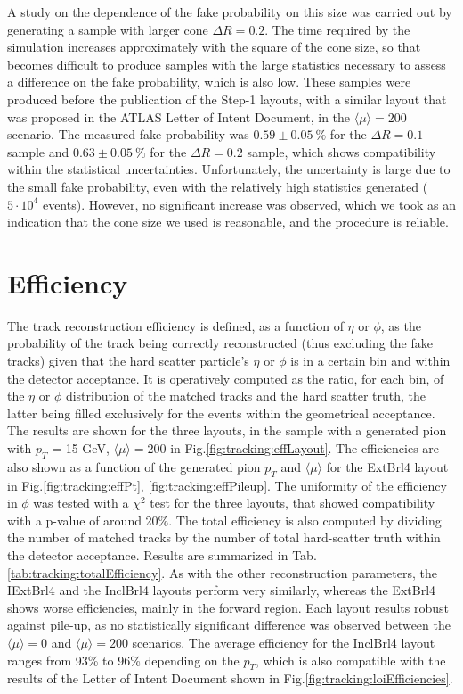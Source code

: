 \documentclass[a4paper,twoside,12pt]{book}
\begin{document}
A study on the dependence of the fake probability on this size was carried out by generating a sample with larger cone $\Delta R = 0.2$.
The time required by the simulation increases approximately with the square of the cone size, so that becomes difficult to produce samples with the large statistics necessary to assess
a difference on the fake probability, which is also low. These samples were produced before the publication of the Step-1 layouts, with a similar layout that was proposed in the
ATLAS Letter of Intent Document\cite{loi}, in the $\langle\mu\rangle = 200$ scenario. The measured fake probability was $0.59 \pm 0.05\ \%$ for the $\Delta R = 0.1$ sample and $0.63 \pm 0.05\ \%$ for
the $\Delta R = 0.2$ sample,
which shows compatibility within the statistical uncertainties. Unfortunately, the uncertainty is large due to the small fake probability, even with the relatively high statistics generated ($5\cdot 10^{4}$
events). However, no significant increase was observed, which we took as an indication that the cone size we used is reasonable, and the procedure is reliable.

\section{Efficiency}
The track reconstruction efficiency is defined, as a function of $\eta$ or $\phi$, as the probability of the track being correctly reconstructed (thus excluding the fake tracks) given that
the hard scatter particle's $\eta$ or $\phi$ is in a certain bin and within the detector acceptance. It is operatively computed as the ratio, for each bin, of the $\eta$ or $\phi$ distribution
of the matched tracks and the hard scatter truth, the latter being filled exclusively for the events within the geometrical acceptance. The results are shown for the three layouts, in the
sample with a generated pion with $p_{T}$ = 15 GeV, $\langle\mu\rangle = 200$ in Fig.\ref{fig:tracking:effLayout}. The efficiencies are also shown as a function of the generated pion $p_{T}$ and $\langle\mu\rangle$ for the ExtBrl4 layout in Fig.\ref{fig:tracking:effPt}, \ref{fig:tracking:effPileup}. The uniformity of the efficiency in $\phi$ was tested with a $\chi^{2}$ test for the three layouts, that 
showed compatibility with a p-value of around 20\%. The total efficiency is also computed by dividing the number of matched tracks by the number of total hard-scatter truth within
the detector acceptance. Results are summarized in Tab.\ref{tab:tracking:totalEfficiency}. As with the other reconstruction parameters, the IExtBrl4 and the InclBrl4 layouts perform
very similarly, whereas the ExtBrl4 shows worse efficiencies, mainly in the forward region.
Each layout results robust against pile-up, as no statistically significant difference was observed between the $\langle\mu\rangle = 0$ and $\langle\mu\rangle = 200$ scenarios. The average efficiency
for the InclBrl4 layout ranges from 93\% to 96\% depending on the $p_{T}$, which is also
compatible with the results of the Letter of Intent Document\cite{loi} shown in Fig.\ref{fig:tracking:loiEfficiencies}.
\end{document}
